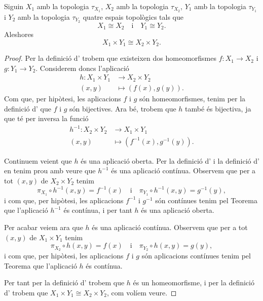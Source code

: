 \documentclass[../../Main.tex]{subfiles}
\begin{document}
	\begin{proposition}
		\label{prop:si dues parelles d'espais topològics són homeomorfs els seus productes cartesians també ho són}
		Siguin \(X_{1}\) amb la topologia \(\tau_{X_{1}}\),  \(X_{2}\) amb la topologia \(\tau_{X_{2}}\), \(Y_{1}\) amb la topologia \(\tau_{Y_{1}}\) i \(Y_{2}\) amb la topologia \(\tau_{Y_{2}}\) quatre espais topològics tals que
		\[
		    X_{1}\cong X_{2}\quad\text{i}\quad Y_{1}\cong Y_{2}.
		\]
		Aleshores
		\[
		    X_{1}\times Y_{1}\cong X_{2}\times Y_{2}.
		\]
		\begin{proof}
			Per la definició d' trobem que existeixen dos homeomorfismes \(f\colon X_{1}\longrightarrow X_{2}\) i \(g\colon Y_{1}\longrightarrow Y_{2}\). Considerem doncs l'aplicació
			\begin{align*}
				h\colon X_{1}\times Y_{1}&\longrightarrow X_{2}\times Y_{2} \\
				(x,y)&\longmapsto(f(x),g(y)).
			\end{align*}
			Com que, per hipòtesi, les aplicacions \(f\) i \(g\) són homeomorfismes, tenim per la definició d' que \(f\) i \(g\) són bijectives. Ara bé, trobem que \(h\) també és bijectiva, ja que té per inversa la funció
			\begin{align*}
				h^{-1}\colon X_{2}\times Y_{2}&\longrightarrow X_{1}\times Y_{1} \\
				(x,y)&\longmapsto(f^{-1}(x),g^{-1}(y)).
			\end{align*}
			
			Continuem veient que \(h\) és una aplicació oberta. Per la definició d' i la definició d' en tenim prou amb veure que \(h^{-1}\) és una aplicació contínua. Observem que per a tot \((x,y)\) de \(X_{2}\times Y_{2}\) tenim
			\[
			    \pi_{X_{1}}\circ h^{-1}(x,y)=f^{-1}(x)\quad\text{i}\quad\pi_{Y_{1}}\circ h^{-1}(x,y)=g^{-1}(y),
			\]
			i com que, per hipòtesi, les aplicacions \(f^{-1}\) i \(g^{-1}\) són contínues tenim pel Teorema  que l'aplicació \(h^{-1}\) és contínua, i per tant \(h\) és una aplicació oberta.
			
			Per acabar veiem ara que \(h\) és una aplicació contínua. Observem que per a tot \((x,y)\) de \(X_{1}\times Y_{1}\) tenim
			\[
			    \pi_{X_{2}}\circ h(x,y)=f(x)\quad\text{i}\quad\pi_{Y_{2}}\circ h(x,y)=g(y),
			\]
			i com que, per hipòtesi, les aplicacions \(f\) i \(g\) són aplicacions contínues tenim pel Teorema  que l'aplicació \(h\) és contínua.
			
			Per tant per la definició d' trobem que \(h\) és un homeomorfisme, i per la definició d' trobem que \(X_{1}\times Y_{1}\cong X_{2}\times Y_{2}\), com volíem veure.
		\end{proof}
	\end{proposition}
\end{document}
